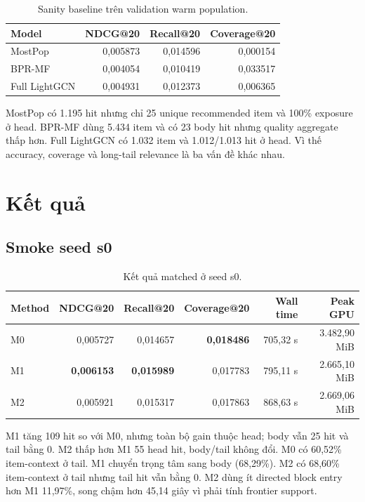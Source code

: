 \documentclass[12pt,a4paper]{article}
\begin{document}
\begin{table}[h]
\centering
\caption{Sanity baseline trên validation warm population.}\label{tab:baseline}
\begin{tabular}{lrrr}
\toprule
Model & NDCG@20 & Recall@20 & Coverage@20 \\
\midrule
MostPop & 0,005873 & 0,014596 & 0,000154 \\
BPR-MF & 0,004054 & 0,010419 & 0,033517 \\
Full LightGCN & 0,004931 & 0,012373 & 0,006365 \\
\bottomrule
\end{tabular}
\end{table}

MostPop có 1.195 hit nhưng chỉ 25 unique recommended item và 100\% exposure ở head. BPR-MF dùng 5.434 item và có 23 body hit nhưng quality aggregate thấp hơn. Full LightGCN có 1.032 item và 1.012/1.013 hit ở head. Vì thế accuracy, coverage và long-tail relevance là ba vấn đề khác nhau.

\section{Kết quả}
\subsection{Smoke seed s0}
\begin{table}[h]
\centering
\caption{Kết quả matched ở seed s0.}\label{tab:s0}
\begin{tabular}{lrrrrr}
\toprule
Method & NDCG@20 & Recall@20 & Coverage@20 & Wall time & Peak GPU \\
\midrule
M0 & 0,005727 & 0,014657 & \textbf{0,018486} & 705,32 s & 3.482,90 MiB \\
M1 & \textbf{0,006153} & \textbf{0,015989} & 0,017783 & 795,11 s & 2.665,10 MiB \\
M2 & 0,005921 & 0,015317 & 0,017863 & 868,63 s & 2.669,06 MiB \\
\bottomrule
\end{tabular}
\end{table}

M1 tăng 109 hit so với M0, nhưng toàn bộ gain thuộc head; body vẫn 25 hit và tail bằng 0. M2 thấp hơn M1 55 head hit, body/tail không đổi. M0 có 60,52\% item-context ở tail. M1 chuyển trọng tâm sang body (68,29\%). M2 có 68,60\% item-context ở tail nhưng tail hit vẫn bằng 0. M2 dùng ít directed block entry hơn M1 11,97\%, song chậm hơn 45,14 giây vì phải tính frontier support.
\end{document}

